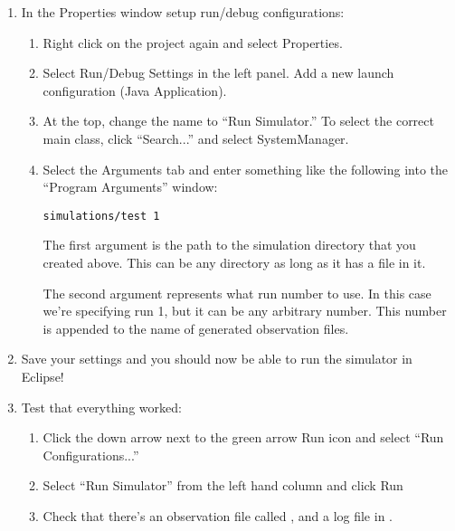 \documentclass[11pt]{article}
\begin{document}
\begin{enumerate}
\item In the Properties window setup run/debug configurations:
  \begin{enumerate}
  \item Right click on the project again and select Properties.
  \item Select Run/Debug Settings in the left panel. Add a new launch
    configuration (Java Application).
  \item At the top, change the name to ``Run Simulator.'' To select the
    correct main class, click ``Search...'' and select SystemManager.
  \item Select the Arguments tab and enter something like the following into the
    ``Program Arguments'' window:

\begin{verbatim}
simulations/test 1
\end{verbatim}

The first argument is the path to the simulation directory that you created
above.  This can be any directory as long as it has a
 file in it.

The second argument represents what run number to use. In this case we're
specifying run 1, but it can be any arbitrary number. This number is appended
to the name of generated observation files.
  \end{enumerate}
  
\item Save your settings and you should now be able to run the simulator in
Eclipse!

\item Test that everything worked:
  \begin{enumerate}
  \item Click the down arrow next to the green arrow Run icon and select ``Run
    Configurations...''
  \item Select ``Run Simulator'' from the left hand column and click Run
  \item Check that there's an observation file called
    , and a log file in
    .
  \end{enumerate}

\end{enumerate}
\end{document}

